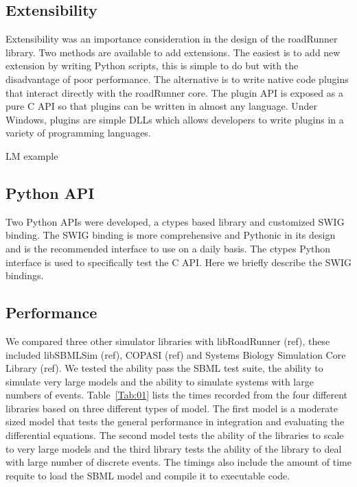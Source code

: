 \documentclass{bioinfo}
\begin{document}
\begin{methods}
\subsection{Extensibility}

Extensibility was an importance consideration in the design of the roadRunner library. Two methods are available to add extensions. The easiest is to add new extension by writing Python scripts, this is simple to do but with the disadvantage of poor performance. The alternative is to write native code plugins that interact directly with the roadRunner core. The plugin API is exposed as a pure C API so that plugins can be written in almost any language. Under Windows, plugins are simple DLLs which allows developers to write plugins in a variety of programming languages.

LM example

\subsection{Python API}

Two Python APIs were developed, a ctypes based library and customized SWIG binding. The SWIG binding is more comprehensive and Pythonic in its design and is the recommended interface to use on a daily basis. The ctypes Python interface is used to specifically test the C API. Here we briefly describe the SWIG bindings.

\subsection{Performance}

We compared three other simulator libraries with libRoadRunner (ref), these included libSBMLSim (ref), COPASI (ref) and Systems Biology Simulation Core Library (ref). We tested the ability pass the SBML test suite, the ability to simulate very large models and the ability to simulate systems with large numbers of events. Table~\ref{Tab:01} lists the times recorded from the four different libraries based on three different types of model. The first model is a moderate sized model that tests the general performance in integration and evaluating the differential equations. The second model tests the ability of the libraries to scale to very large models and the third library tests the ability of the library to deal with large number of discrete events. The timings also include the amount of time requite to load the SBML model and compile it to executable code.


\end{methods}
\end{document}
